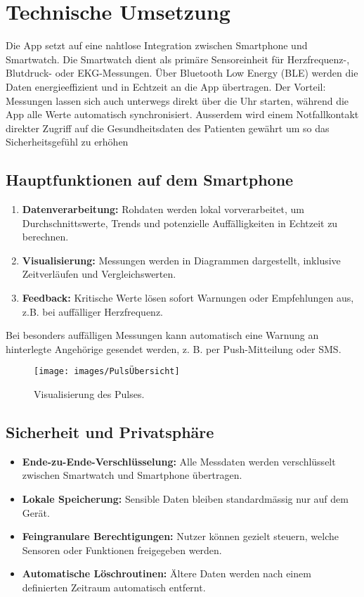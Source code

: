\section{Technische Umsetzung}
Die App setzt auf eine nahtlose Integration zwischen Smartphone und Smartwatch. Die Smartwatch dient als primäre Sensoreinheit für Herzfrequenz-, Blutdruck- oder EKG-Messungen. Über Bluetooth Low Energy (BLE) werden die Daten energieeffizient und in Echtzeit an die App übertragen.
Der Vorteil: Messungen lassen sich auch unterwegs direkt über die Uhr starten, während die App alle Werte automatisch synchronisiert. Ausserdem wird einem Notfallkontakt direkter Zugriff auf die Gesundheitsdaten des Patienten gewährt um so das Sicherheitsgefühl zu erhöhen

\subsection{Hauptfunktionen auf dem Smartphone}
\begin{enumerate}
	\item \textbf{Datenverarbeitung:} 
	Rohdaten werden lokal vorverarbeitet, um Durchschnittswerte, Trends und 
	potenzielle Auffälligkeiten in Echtzeit zu berechnen.
	\item \textbf{Visualisierung:} 
	Messungen werden in Diagrammen dargestellt, inklusive Zeitverläufen und 
	Vergleichswerten.
	\item \textbf{Feedback:} 
	Kritische Werte lösen sofort Warnungen oder Empfehlungen aus, 
	z.B. bei auffälliger Herzfrequenz.
\end{enumerate}

Bei besonders auffälligen Messungen kann automatisch eine Warnung an hinterlegte Angehörige gesendet werden, z. B. per Push-Mitteilung oder SMS.

\begin{figure}[h!]
	\centering
	\texttt{[image: images/PulsÜbersicht]}
	\caption{Visualisierung des Pulses.}
	\label{fig:pulsubersicht}
\end{figure}

\subsection{Sicherheit und Privatsphäre}
\begin{itemize}
	\item \textbf{Ende-zu-Ende-Verschlüsselung:} 
	Alle Messdaten werden verschlüsselt zwischen Smartwatch und Smartphone übertragen.
	\item \textbf{Lokale Speicherung:} 
	Sensible Daten bleiben standardmässig nur auf dem Gerät.
	\item \textbf{Feingranulare Berechtigungen:} 
	Nutzer können gezielt steuern, welche Sensoren oder Funktionen freigegeben werden.
	\item \textbf{Automatische Löschroutinen:} 
	Ältere Daten werden nach einem definierten Zeitraum automatisch entfernt.
\end{itemize}

